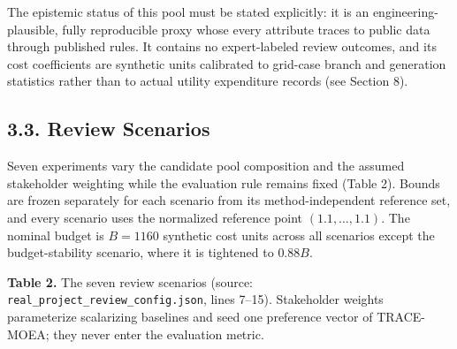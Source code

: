 \documentclass[
  10pt,
  a4paper,
]{article}
\begin{document}
The epistemic status of this pool must be stated explicitly: it is an
engineering-plausible, fully reproducible proxy whose every attribute
traces to public data through published rules. It contains no
expert-labeled review outcomes, and its cost coefficients are synthetic
units calibrated to grid-case branch and generation statistics rather
than to actual utility expenditure records (see Section 8).

\subsection{3.3. Review Scenarios}\label{review-scenarios}

Seven experiments vary the candidate pool composition and the assumed
stakeholder weighting while the evaluation rule remains fixed (Table 2).
Bounds are frozen separately for each scenario from its
method-independent reference set, and every scenario uses the normalized
reference point \((1.1,\ldots,1.1)\). The nominal budget is \(B=1160\)
synthetic cost units across all scenarios except the budget-stability
scenario, where it is tightened to \(0.88B\).

\textbf{Table 2.} The seven review scenarios (source:
\texttt{real\_project\_review\_config.json}, lines 7--15). Stakeholder
weights parameterize scalarizing baselines and seed one preference
vector of TRACE-MOEA; they never enter the evaluation metric.
\end{document}

